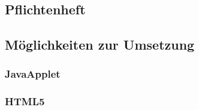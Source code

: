 \subsection{Pflichtenheft}
\label{sec:Pflichtenheft}

\subsection{Möglichkeiten zur Umsetzung}
\label{sec:Möglichkeiten zur Umsetzung}

\subsubsection{JavaApplet}
\label{sec:JavaApplet}

\subsubsection{HTML5}
\label{sec:HTML5}



